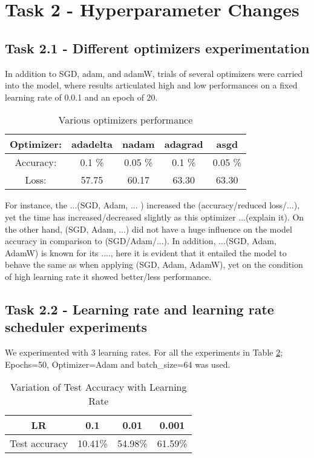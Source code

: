 \documentclass{article} %
\begin{document}
\section*{Task 2 - Hyperparameter Changes}

\subsection*{Task 2.1 - Different optimizers experimentation}
In addition to SGD, adam, and adamW, trials of several optimizers were carried into the model, where results articulated high and low performances on a fixed learning rate of 0.0.1 and an epoch of 20. 


\begin{table}[h!]
\centering
\begin{tabular}{ | c | c | c | c | c | }
\hline
 Optimizer: & adadelta & nadam & adagrad & asgd\\
 \hline
 Accuracy: & 0.1 \% & 0.05 \% & 0.1 \% & 0.05 \%\\
 \hline
 Loss: & 57.75 & 60.17 & 63.30 & 63.30\\
 \hline
\end{tabular}
\caption{Various optimizers performance}
\label{table:91}
\end{table}



For instance, the ...(SGD, Adam, ... ) increased the (accuracy/reduced loss/...), yet the time has increased/decreased slightly as this optimizer ...(explain it). 
On the other hand, (SGD, Adam, ...) did not have a huge influence on the model accuracy in comparison to (SGD/Adam/...). In addition, ...(SGD, Adam, AdamW) is known for its ...., here it is evident that it entailed the model to behave the same as when applying (SGD, Adam, AdamW), yet on the condition of high learning rate it showed better/less performance.



\subsection*{Task 2.2 - Learning rate and learning rate scheduler experiments}


We experimented with 3 learning rates.
For all the experiments in Table \ref{table:3}; Epochs=50, Optimizer=Adam and batch\_size=64 was used.

\begin{table}[h!]
\centering
\begin{tabular}{ | c | c | c | c |}
\hline
 LR  & 0.1 & 0.01 & 0.001\\
 \hline
 Test accuracy & 10.41\% & 54.98\% & 61.59\%\\
 \hline
\end{tabular}
\caption{Variation of Test Accuracy with Learning Rate}
\label{table:3}
\end{table}
\end{document}

